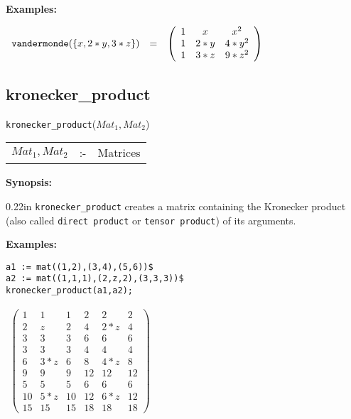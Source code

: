 {\bf Examples:}

\begin{flushleft}  
\hspace*{0.1in}
\begin{math}  
\begin{array}{ccc}
{\tt vandermonde}(\{x,2*y,3*z\}) & = & 
        \left( \begin{array}{ccc} 1 & x & x^2 \\ 1 & 2*y & 4*y^2 \\ 1 
& 3*z & 9*z^2 
 \end{array} \right) 
\end{array}
\end{math}  
\end{flushleft}

\subsection{kronecker\_product}

\hspace*{0.175in} {\tt kronecker\_product}($Mat_1,Mat_2$)

\hspace*{0.1in}
\begin{tabular}{l l l}
$Mat_1,Mat_2$ &:-& Matrices
\end{tabular}

{\bf Synopsis:} 

\begin{addtolength}{\leftskip}{0.22in}
{\tt kronecker\_product} creates a matrix containing the Kronecker product 
(also called {\tt direct product} or {\tt tensor product}) of its arguments.

\end{addtolength}

{\bf Examples:}
\begin{verbatim}
a1 := mat((1,2),(3,4),(5,6))$
a2 := mat((1,1,1),(2,z,2),(3,3,3))$
kronecker_product(a1,a2);
\end{verbatim}
\begin{flushleft}
\hspace*{0.1in}
\begin{math}
\begin{array}{ccc}
\left( \begin{array}{cccccc} 1 & 1 & 1 & 2 & 2 & 2 \\
2 &  z & 2 & 4  &2*z &4 \\
3 &  3 & 3 & 6  & 6  &6 \\
3 &  3 & 3 & 4  & 4  &4 \\
6 & 3*z& 6 & 8  &4*z &8 \\
9 &  9 & 9 & 12 &12  &12\\
5 &  5 & 5 & 6  & 6  &6 \\
10 &5*z& 10& 12 &6*z &12 \\ 
15 &15 & 15& 18 &18  &18 \end{array} \right)
\end{array}
\end{math}
\end{flushleft}

